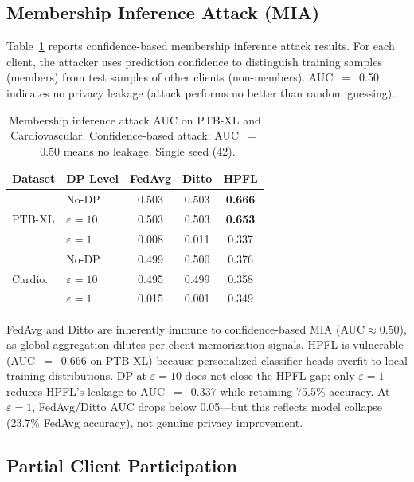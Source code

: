 \documentclass[conference]{IEEEtran}
\begin{document}
\subsection{Membership Inference Attack (MIA)}
\label{sec:mia}

Table~\ref{tab:mia_results} reports confidence-based membership inference attack results. For each client, the attacker uses prediction confidence to distinguish training samples (members) from test samples of other clients (non-members). AUC~$=$~0.50 indicates no privacy leakage (attack performs no better than random guessing).

\begin{table}[htbp]
\centering
\caption{Membership inference attack AUC on PTB-XL and Cardiovascular. Confidence-based attack: AUC~$=$~0.50 means no leakage. Single seed (42).}
\label{tab:mia_results}
\small
\begin{tabular}{llccc}
\toprule
\textbf{Dataset} & \textbf{DP Level} & \textbf{FedAvg} & \textbf{Ditto} & \textbf{HPFL} \\
\midrule
\multirow{3}{*}{PTB-XL} & No-DP & 0.503 & 0.503 & \textbf{0.666} \\
 & $\varepsilon{=}10$ & 0.503 & 0.503 & \textbf{0.653} \\
 & $\varepsilon{=}1$ & 0.008 & 0.011 & 0.337 \\
\midrule
\multirow{3}{*}{Cardio.} & No-DP & 0.499 & 0.500 & 0.376 \\
 & $\varepsilon{=}10$ & 0.495 & 0.499 & 0.358 \\
 & $\varepsilon{=}1$ & 0.015 & 0.001 & 0.349 \\
\bottomrule
\end{tabular}

\vspace{1mm}
\footnotesize{FedAvg and Ditto are inherently immune to confidence-based MIA (AUC$\approx$0.50), as global aggregation dilutes per-client memorization signals. HPFL is vulnerable (AUC~$=$~0.666 on PTB-XL) because personalized classifier heads overfit to local training distributions. DP at $\varepsilon{=}10$ does not close the HPFL gap; only $\varepsilon{=}1$ reduces HPFL's leakage to AUC~$=$~0.337 while retaining 75.5\% accuracy. At $\varepsilon{=}1$, FedAvg/Ditto AUC drops below 0.05---but this reflects model collapse (23.7\% FedAvg accuracy), not genuine privacy improvement.}
\end{table}

\subsection{Partial Client Participation}
\label{sec:partial_participation}
\end{document}
